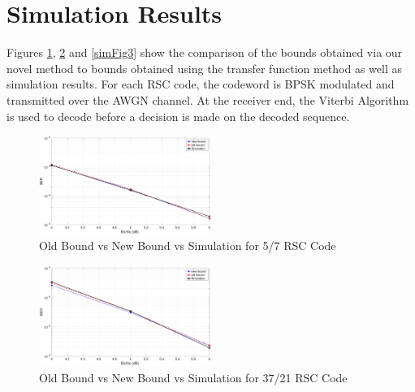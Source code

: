 \section{Simulation Results}
Figures \ref{simFig1}, \ref{simFig2} and \ref{simFig3} show the comparison of the bounds obtained via our novel method to bounds obtained using the transfer function method as well as simulation results. For each RSC code, the codeword is BPSK modulated and transmitted over the AWGN channel. At the receiver end, the Viterbi Algorithm is used to decode before a decision is made on the decoded sequence.

\begin{figure}[h]
\centering
		\includegraphics[width=0.5\textwidth]{./Images/RSC_5_7_v3.eps}
		\caption{Old Bound vs New Bound vs Simulation for 5/7 RSC Code}
		\label{simFig1}
		\end{figure}


\begin{figure}[h]
\centering
		\includegraphics[width=0.5\textwidth]{./Images/RSC_37_21_v2.eps}
		\caption{Old Bound vs New Bound vs Simulation for 37/21 RSC Code}
		\label{simFig2}
		\end{figure}



